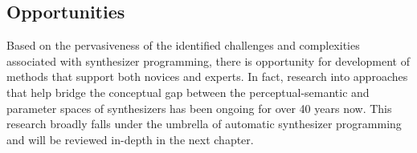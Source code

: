 





\subsection{Opportunities}
Based on the pervasiveness of the identified challenges and complexities associated with synthesizer programming, there is opportunity for development of methods that support both novices and experts. In fact, research into approaches that help bridge the conceptual gap between the perceptual-semantic and parameter spaces of synthesizers has been ongoing for over 40 years now. This research broadly falls under the umbrella of automatic synthesizer programming and will be reviewed in-depth in the next chapter.

